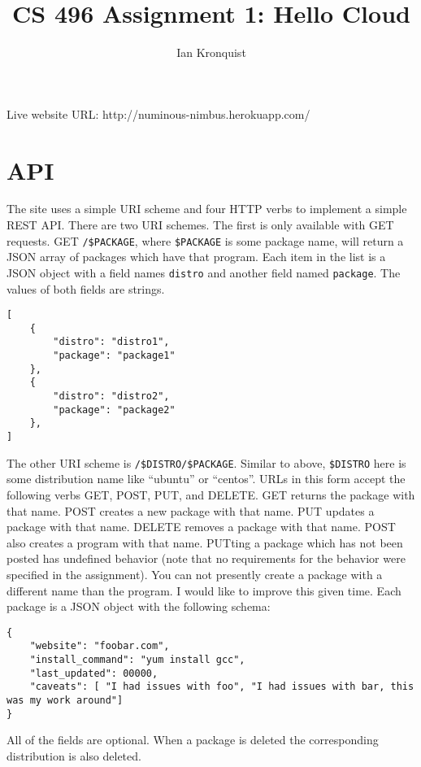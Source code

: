 \documentclass[12pt]{article}
\title{CS 496 Assignment 1: Hello Cloud}
\author{Ian Kronquist}
\begin{document}
\maketitle

Live website URL: http://numinous-nimbus.herokuapp.com/

\section{API}
The site uses a simple URI scheme and four HTTP verbs to implement a simple REST API. There are two URI schemes. The first is only available with GET requests. GET \texttt{/\$PACKAGE}, where \texttt{\$PACKAGE} is some package name, will return a JSON array of packages which have that program. Each item in the list is a JSON object with a field names \texttt{distro} and another field named \texttt{package}. The values of both fields are strings.

\begin{lstlisting}
[
	{
		"distro": "distro1",
		"package": "package1"
	},
	{
		"distro": "distro2",
		"package": "package2"
	},
]
\end{lstlisting}

The other URI scheme is \texttt{/\$DISTRO/\$PACKAGE}. Similar to above, \texttt{\$DISTRO} here is some distribution name like ``ubuntu'' or ``centos''. URLs in this form accept the following verbs GET, POST, PUT, and DELETE. GET returns the package with that name. POST creates a new package with that name. PUT updates a package with that name. DELETE removes a package with that name. POST also creates a program with that name. PUTting a package which has not been posted has undefined behavior (note that no requirements for the  behavior were specified in the assignment). You can not presently create a package with a different name than the program. I would like to improve this given time. Each package is a JSON object with the following schema:

\begin{lstlisting}
{
	"website": "foobar.com",
	"install_command": "yum install gcc",
	"last_updated": 00000,
	"caveats": [ "I had issues with foo", "I had issues with bar, this was my work around"]
}
\end{lstlisting}
All of the fields are optional.
When a package is deleted the corresponding distribution is also deleted.
\end{document}
